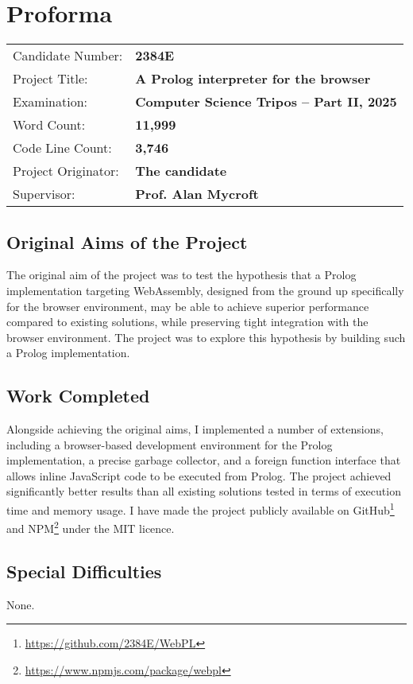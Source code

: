 \chapter*{Proforma}

{\large \begin{tabular}{ll}
Candidate Number: & {\bf 2384E} \\
Project Title: & {\bf A Prolog interpreter for the browser} \\
Examination: & {\bf Computer Science Tripos -- Part II, 2025} \\
Word Count: & {\bf 11,999}\footnotemark \\
Code Line Count: & {\bf 3,746}\footnotemark \\
Project Originator: & {\bf The candidate} \\
Supervisor: & {\bf Prof. Alan Mycroft}
\end{tabular}}


\section*{Original Aims of the Project}

The original aim of the project was to test the hypothesis that a Prolog implementation targeting WebAssembly, designed from the ground up specifically for the browser environment, may be able to achieve superior performance compared to existing solutions, while preserving tight integration with the browser environment. The project was to explore this hypothesis by building such a Prolog implementation.

\section*{Work Completed}

Alongside achieving the original aims, I implemented a number of extensions, including a browser-based development environment for the Prolog implementation, a precise garbage collector, and a foreign function interface that allows inline JavaScript code to be executed from Prolog. The project achieved significantly better results than all existing solutions tested in terms of execution time and memory usage. I have made the project publicly available on GitHub\footnote{\url{https://github.com/2384E/WebPL}} and NPM\footnote{\url{https://www.npmjs.com/package/webpl}} under the MIT licence.

\section*{Special Difficulties}

None.